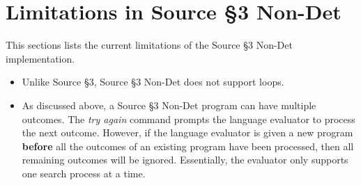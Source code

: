 

\newpage



\newpage





























\section*{Limitations in Source \S 3 Non-Det}
This sections lists the current limitations of the Source \S 3 Non-Det implementation.

\begin{itemize}
\item Unlike Source \S 3, Source \S 3 Non-Det does not support loops.
\item As discussed above, a Source \S 3 Non-Det program can have multiple outcomes. The \emph{try again} command 
prompts the language evaluator to process the next outcome. However, if the language evaluator is given a new program \textbf{before} all the outcomes of an existing program have been processed, then all remaining outcomes will be ignored. Essentially, the evaluator only supports one search process at a time.
\end{itemize}


\newpage



\newpage



\newpage



    
